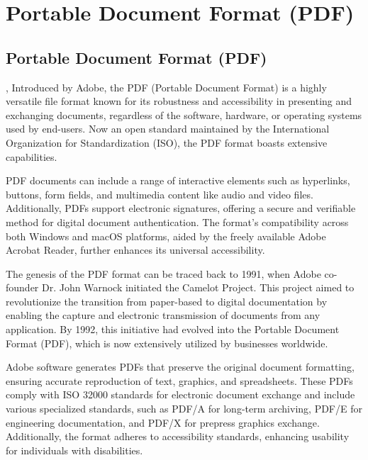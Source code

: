 %
%
%



\chapter{Portable Document Format (PDF)}

\section{Portable Document Format (PDF)}, Introduced by Adobe, the PDF (Portable Document Format) is a highly versatile file format known for its robustness and accessibility in presenting and exchanging documents, regardless of the software, hardware, or operating systems used by end-users. Now an open standard maintained by the International Organization for Standardization (ISO), the PDF format boasts extensive capabilities\cite{Adobe:2025}.

 PDF documents can include a range of interactive elements such as hyperlinks, buttons, form fields, and multimedia content like audio and video files. Additionally, PDFs support electronic signatures, offering a secure and verifiable method for digital document authentication. The format's compatibility across both Windows and macOS platforms, aided by the freely available Adobe Acrobat Reader, further enhances its universal accessibility.


The genesis of the PDF format can be traced back to 1991, when Adobe co-founder Dr. John Warnock initiated the Camelot Project. This project aimed to revolutionize the transition from paper-based to digital documentation by enabling the capture and electronic transmission of documents from any application. By 1992, this initiative had evolved into the Portable Document Format (PDF), which is now extensively utilized by businesses worldwide.

 Adobe software generates PDFs that preserve the original document formatting, ensuring accurate reproduction of text, graphics, and spreadsheets. These PDFs comply with ISO 32000 standards for electronic document exchange and include various specialized standards, such as PDF/A for long-term archiving, PDF/E for engineering documentation, and PDF/X for prepress graphics exchange. Additionally, the format adheres to accessibility standards, enhancing usability for individuals with disabilities.

